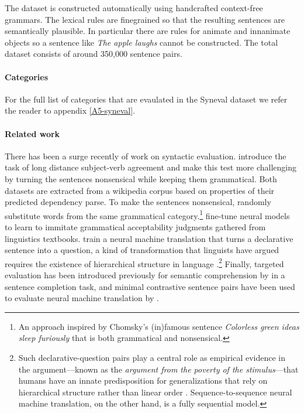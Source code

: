 The dataset is constructed automatically using handcrafted context-free grammars. The lexical rules are finegrained so that the resulting sentences are semantically plausible. In particular there are rules for animate and innanimate objects so a sentence like \textit{The apple laughs} cannot be constructed. The total dataset consists of around 350,000 sentence pairs.

\paragraph{Categories} For the full list of categories that are evaulated in the Syneval dataset we refer the reader to appendix \ref{A5-syneval}.

\paragraph{Related work} There has been a surge recently of work on syntactic evaluation. \citet{linzen2016syntax} introduce the task of long distance subject-verb agreement and \citet{gulordava2018colorless} make this test more challenging by turning the sentences nonsensical while keeping them grammatical. Both datasets are extracted from a wikipedia corpus based on properties of their predicted dependency parse. To make the sentences nonsensical, \citet{gulordava2018colorless} randomly substitute words from the same grammatical category.\footnote{An approach inspired by Chomsky's (in)famous sentence \textit{Colorless green ideas sleep furiously} that is both grammatical and nonsensical.} \citet{warstadt2018acceptability} fine-tune neural models to learn to immitate grammatical acceptability judgments gathered from linguistics textbooks.
\citet{mccoy2018revisiting} train a neural machine translation that turns a declarative sentence into a question, a kind of transformation that linguists have argued requires the existence of hierarchical structure in language \citep{everaert2015structures}.\footnote{Such declarative-question pairs play a central role as empirical evidence in the argument---known as the \textit{argument from the poverty of the stimulus}---that humans have an innate predisposition for generalizations that rely on hierarchical structure rather than linear order \citep{chomsky1980rules}. Sequence-to-sequence neural machine translation, on the other hand, is a fully sequential model.} Finally, targeted evaluation has been introduced previously for semantic comprehension by \citet{zweig2011microsoft} in a sentence completion task, and minimal contrastive sentence pairs have been used to evaluate neural machine translation by \citet{sennrich2017grammatical}.


